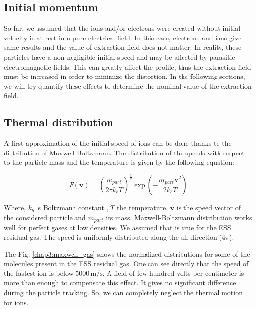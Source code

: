 \begin{refsection}
	\section{Initial momentum}
  So far, we assumed that the ions and/or electrons were created without initial velocity ie at rest in a pure electrical field. In this case, electrons and ions give same results and the value of extraction field does not matter. In reality, these particles have a non-negligible initial speed and may be affected by parasitic electromagnetic fields. This can greatly affect the profile, thus the extraction field must be increased in order to minimize the distortion. In the following sections, we will try quantify these effects to determine the nominal value of the extraction field. 

	\subsection{Thermal distribution}
	A first approximation of the initial speed of ions can be done thanks to the distribution of Maxwell-Boltzmann. The distribution of the speeds with respect to the particle mass and the temperature is given by the following equation:

	\begin{equation}
		F(\boldsymbol{v}) = \left(\frac{m_{part}}{2 \pi k_{b} T}\right)^{\frac{3}{2}}\exp\left(-\frac{m_{part}\boldsymbol{v}^{2}}{2 k_{b} T}\right)
	\end{equation}
	
	Where, $k_{b}$ is Boltzmann constant , $T$ the temperature, $\boldsymbol{v}$ is the speed vector of the considered particle and $m_{part}$ its mass. Maxwell-Boltzmann distribution works well for perfect gases at low densities. We assumed that is true for the ESS residual gas. The speed is uniformly distributed along the all direction ($4\pi$).

	The Fig. \ref{chap3:maxwell_gas} shows the normalized distributions for some of the molecules present in the ESS residual gas. One can see directly that the speed of the fastest ion is below $5000\,\mathrm{m/s}$. A field of few hundred volts per centimeter is more than enough to compensate this effect. It gives no significant difference during the particle tracking. So, we can completely neglect the thermal motion for ions.


\end{refsection}
